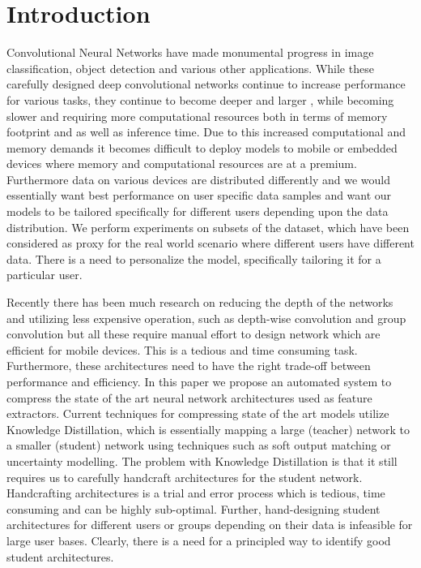 \documentclass[../main]{subfiles}
\begin{document}
\section{Introduction}
    \label{sec:intro}
    Convolutional Neural Networks have made monumental progress in image classification, object detection and various other applications.
    While these carefully designed deep convolutional networks continue to increase performance for various tasks, they continue to become deeper and larger \cite{szegedy2017inception,real2018regularized,hu2017squeeze}, while becoming slower and requiring more computational resources both in terms of memory footprint and as well as inference time.
    Due to this increased computational and memory demands it becomes difficult to deploy models to mobile or embedded devices where memory and computational resources are at a premium.
    Furthermore data on various devices are distributed differently and we would essentially want best performance on user specific data samples and want our models to be tailored specifically for different users depending upon the data distribution.
    We perform experiments on subsets of the dataset, which have been considered as proxy for the real world scenario where different users have different data.
    There is a need to personalize the model, specifically tailoring it for a particular user.
    
    Recently there has been much research on reducing the depth of the networks \cite{iandola2016squeezenet} and utilizing less expensive operation, such as depth-wise convolution \cite{howard2017mobilenets} and group convolution \cite{DBLP:journals/corr/ZhangZLS17} but all these require manual effort to design network which are efficient for mobile devices.
    This is a tedious and time consuming task.
    Furthermore, these architectures need to have the right trade-off between performance and efficiency.
    In this paper we propose an automated system to compress the state of the art neural network architectures used as feature extractors.
    Current techniques for compressing state of the art models utilize Knowledge Distillation, which is essentially mapping a large (teacher) network to a smaller (student) network using techniques such as soft output matching or uncertainty modelling.
    The problem with Knowledge Distillation is that it still requires us to carefully handcraft architectures for the student network.
    Handcrafting architectures is a trial and error process which is tedious, time consuming and can be highly sub-optimal.
    Further, hand-designing student architectures for different users or groups depending on their data is infeasible for large user bases.
    Clearly, there is a need for a principled way to identify good student architectures.
    
\end{document}
